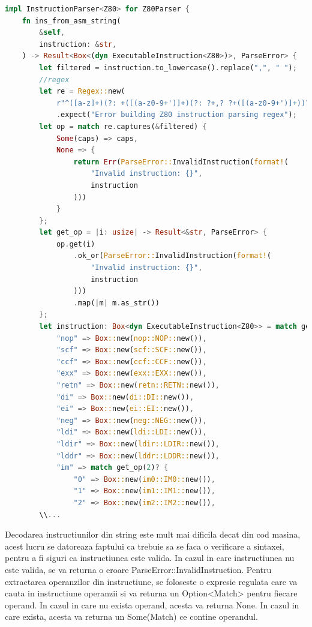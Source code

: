 \documentclass[titlepage,12pt]{article}
\DeclareRobustCommand{\code}[1]{{\ttfamily\small #1}}
\begin{document}
\begin{lstlisting}[language=Rust,caption={Sectiune decodor din string},label={lst:decoder-string}]
impl InstructionParser<Z80> for Z80Parser {
    fn ins_from_asm_string(
        &self,
        instruction: &str,
    ) -> Result<Box<(dyn ExecutableInstruction<Z80>)>, ParseError> {
        let filtered = instruction.to_lowercase().replace(",", " ");
        //regex
        let re = Regex::new(
            r"^([a-z]+)(?: +([(a-z0-9+')]+)(?: ?+,? ?+([(a-z0-9+')]+))?)?$")
            .expect("Error building Z80 instruction parsing regex");
        let op = match re.captures(&filtered) {
            Some(caps) => caps,
            None => {
                return Err(ParseError::InvalidInstruction(format!(
                    "Invalid instruction: {}",
                    instruction
                )))
            }
        };
        let get_op = |i: usize| -> Result<&str, ParseError> {
            op.get(i)
                .ok_or(ParseError::InvalidInstruction(format!(
                    "Invalid instruction: {}",
                    instruction
                )))
                .map(|m| m.as_str())
        };
        let instruction: Box<dyn ExecutableInstruction<Z80>> = match get_op(1)? {
            "nop" => Box::new(nop::NOP::new()),
            "scf" => Box::new(scf::SCF::new()),
            "ccf" => Box::new(ccf::CCF::new()),
            "exx" => Box::new(exx::EXX::new()),
            "retn" => Box::new(retn::RETN::new()),
            "di" => Box::new(di::DI::new()),
            "ei" => Box::new(ei::EI::new()),
            "neg" => Box::new(neg::NEG::new()),
            "ldi" => Box::new(ldi::LDI::new()),
            "ldir" => Box::new(ldir::LDIR::new()),
            "lddr" => Box::new(lddr::LDDR::new()),
            "im" => match get_op(2)? {
                "0" => Box::new(im0::IM0::new()),
                "1" => Box::new(im1::IM1::new()),
                "2" => Box::new(im2::IM2::new()),
        \\...
\end{lstlisting}

Decodarea instructiunilor din string este mult mai dificila decat din cod masina, acest lucru se datoreaza faptului ca trebuie sa se faca o verificare a sintaxei, pentru a fi siguri ca instructiunea este valida. In cazul in care instructiunea nu este valida, se va returna o eroare \code{ParseError::InvalidInstruction}.
Pentru extractarea operanzilor din instructiune, se foloseste o expresie regulata care va cauta in instructiune operanzii si va returna un \code{Option<Match>} pentru fiecare operand. In cazul in care nu exista operand, acesta va returna \code{None}. In cazul in care exista, acesta va returna un \code{Some(Match)} ce contine operandul.
\end{document}
